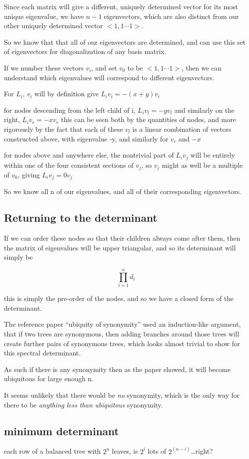 \documentclass{report}
\begin{document}
Since each matrix will give a different, uniquely determined vector for its
most unique eigenvalue, we have $n-1$ eigenvectors, which are also distinct from
our other uniquely determined vector $<1, 1\cdots 1>$.

So we know that that all of our eigenvectors are determined, and can use this
set of eigenvectors for diagonalization of any basis matrix.


If we number these vectors $v_i$, and set $v_0$ to be $<1, 1\cdots 1>$, then we can
understand which eigenvalues will correspond to different eigenvectors.

For $L_i$, $v_i$ will by definition give $L_i v_i = -(x+y) v_i$

for nodes descending from the left child of i, $L_i v_l = -y v_l$
and similarly on the right, $L_i v_r = -x v_r$
this can be seen both by the quantities of nodes, and more rigorously by the
fact that each of these $v_l$ is a linear combination of vectors constructed
above, with eigenvalue -y, and similarly for $v_r$ and $-x$

for nodes above and anywhere else, the nontrivial part of $L_i v_j$ will be
entirely within one of the four consistent sections of $v_j$, so $v_j$ might as
well be a multiple of $v_0$, giving $L_i v_j = 0 v_j$

So we know all n of our eigenvalues, and all of their corresponding
eigenvectors.


\subsection{Returning to the determinant}


If we can order these nodes so that their children always come after them, then
the matrix of eigenvalues will be upper triangular, and so its determinant will
simply be

\[\prod_{i=1}^n d_i\]

this is simply the pre-order of the nodes, and so we have a closed form of the
determinant.

The reference paper ``ubiquity of synonymity'' used an induction-like argument,
that if two trees are synonymous, then adding branches around those trees will
create further pairs of synonymous trees, which looks almost trivial to show
for this spectral determinant.

As such if there is any synonymity then as the paper showed, it will become
ubiquitous for large enough n.

It seems unlikely that there would be \emph{no} synonymity, which is the only way
for there to be \emph{anything less than ubiquitous} synonymity.


\subsection{minimum determinant}

each row of a balanced tree with $2^n$ leaves, is $2^i$ lots of $2^(n-i)$\ldots right?
\end{document}

